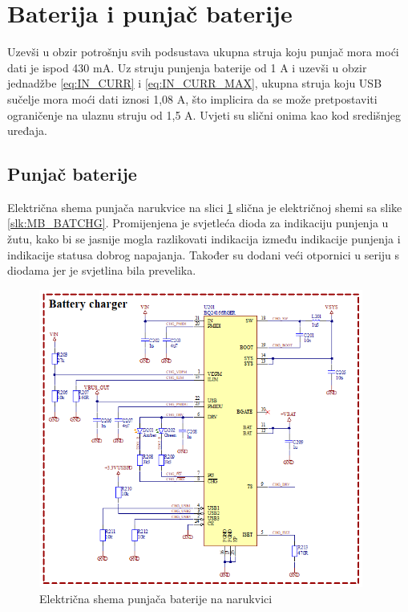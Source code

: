 \section{Baterija i punjač baterije}
\label{sec:BR_BATCHG}
Uzevši u obzir potrošnju svih podsustava ukupna struja koju punjač mora moći dati je ispod 430 mA. Uz struju punjenja baterije od 1 A i uzevši u obzir jednadžbe \ref{eq:IN_CURR} i \ref{eq:IN_CURR_MAX}, ukupna struja koju USB sučelje mora moći dati iznosi 1,08 A, što implicira da se može pretpostaviti ograničenje na ulaznu struju od 1,5 A. Uvjeti su slični onima kao kod središnjeg uređaja.

\subsection{Punjač baterije}
Električna shema punjača narukvice na slici \ref{slk:BR_BATCHG} slična je električnoj shemi sa slike \ref{slk:MB_BATCHG}. Promijenjena je svjetleća dioda za indikaciju punjenja u žutu, kako bi se jasnije mogla razlikovati indikacija između indikacije punjenja i indikacije statusa dobrog napajanja. Također su dodani veći otpornici u seriju s diodama jer je svjetlina bila prevelika.
\begin{figure}[H]
    \centering
    \includegraphics[width=0.95\textwidth]{Figures/BR_BATCHG.png}
    \caption{Električna shema punjača baterije na narukvici}
    \label{slk:BR_BATCHG}
\end{figure}

